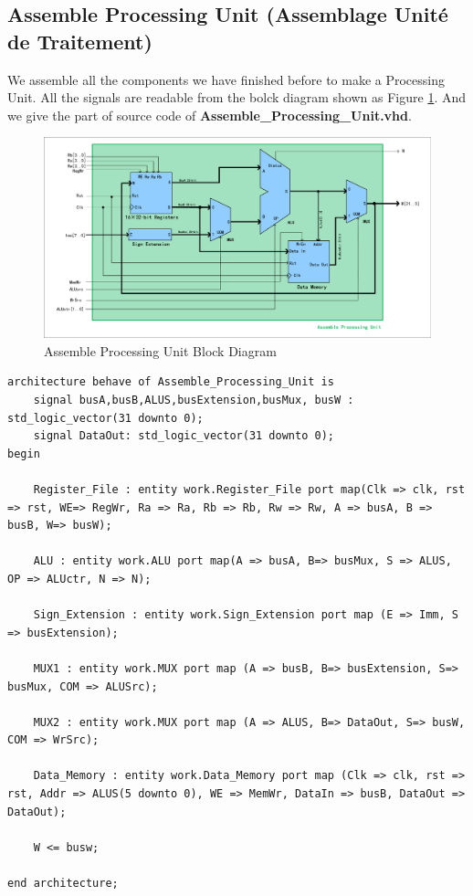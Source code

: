 
\subsection{Assemble Processing Unit (Assemblage Unité de Traitement)}

We assemble all the components we have finished before to make a Processing Unit.
All the signals are readable from the bolck diagram shown as Figure \ref{fig:AsmbUT}.
And we give the part of source code of \textbf{Assemble\_Processing\_Unit.vhd}.

\begin{figure}[htp]
    \centering
    \includegraphics[width=1\textwidth]{picture/AsmbUT.pdf}
    \caption{Assemble Processing Unit Block Diagram}     
    \label{fig:AsmbUT}
\end{figure}

\begin{lstlisting}[style=vhdl, breaklines]
architecture behave of Assemble_Processing_Unit is
    signal busA,busB,ALUS,busExtension,busMux, busW : std_logic_vector(31 downto 0);
    signal DataOut: std_logic_vector(31 downto 0);
begin
  
    Register_File : entity work.Register_File port map(Clk => clk, rst => rst, WE=> RegWr, Ra => Ra, Rb => Rb, Rw => Rw, A => busA, B => busB, W=> busW); 
  
    ALU : entity work.ALU port map(A => busA, B=> busMux, S => ALUS, OP => ALUctr, N => N); 
  
    Sign_Extension : entity work.Sign_Extension port map (E => Imm, S => busExtension);
  
    MUX1 : entity work.MUX port map (A => busB, B=> busExtension, S=> busMux, COM => ALUSrc); 
  
    MUX2 : entity work.MUX port map (A => ALUS, B=> DataOut, S=> busW, COM => WrSrc);
  
    Data_Memory : entity work.Data_Memory port map (Clk => clk, rst => rst, Addr => ALUS(5 downto 0), WE => MemWr, DataIn => busB, DataOut => DataOut); 
    
    W <= busw; 
  
end architecture;
\end{lstlisting}
